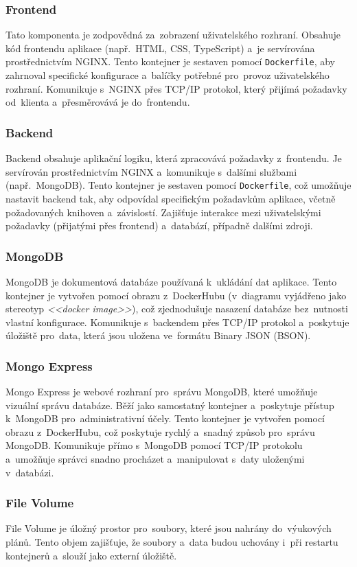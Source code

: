 \documentclass[male,czech,api_bc]{kitheses}
\begin{document}
\subsubsection{Frontend}
Tato komponenta je zodpovědná za~zobrazení uživatelského rozhraní. Obsahuje kód frontendu aplikace (např.~HTML, CSS, TypeScript) a~je servírována prostřednictvím NGINX. Tento kontejner je sestaven pomocí \texttt{Dockerfile}, aby zahrnoval specifické konfigurace a~balíčky potřebné pro~provoz uživatelského rozhraní. Komunikuje s~NGINX přes TCP/IP protokol, který přijímá požadavky od~klienta a~přesměrovává je do~frontendu.

\subsubsection{Backend}
Backend obsahuje aplikační logiku, která zpracovává požadavky z~frontendu. Je servírován prostřednictvím NGINX a~komunikuje s~dalšími službami (např.~MongoDB). Tento kontejner je sestaven pomocí \texttt{Dockerfile}, což umožňuje nastavit backend tak, aby odpovídal specifickým požadavkům aplikace, včetně požadovaných knihoven a~závislostí. Zajišťuje interakce mezi uživatelskými požadavky (přijatými přes frontend) a~databází, případně dalšími zdroji.

\subsubsection{MongoDB}
MongoDB je dokumentová databáze používaná k~ukládání dat aplikace. Tento kontejner je vytvořen pomocí obrazu z~DockerHubu (v~diagramu vyjádřeno jako stereotyp \textit{<<docker image>>}), což zjednodušuje nasazení databáze bez~nutnosti vlastní konfigurace. Komunikuje s~backendem přes TCP/IP protokol a~poskytuje úložiště pro~data, která jsou uložena ve~formátu Binary JSON (BSON).

\subsubsection{Mongo Express}
Mongo Express je webové rozhraní pro~správu MongoDB, které umožňuje vizuální správu databáze. Běží jako samostatný kontejner a~poskytuje přístup k~MongoDB pro~administrativní účely. Tento kontejner je vytvořen pomocí obrazu z~DockerHubu, což poskytuje rychlý a~snadný způsob pro~správu MongoDB. Komunikuje přímo s~MongoDB pomocí TCP/IP protokolu a~umožňuje správci snadno procházet a~manipulovat s~daty uloženými v~databázi.

\subsubsection{File Volume}
File Volume je úložný prostor pro~soubory, které jsou nahrány do~výukových plánů. Tento objem zajišťuje, že soubory a~data budou uchovány i~při restartu kontejnerů a~slouží jako externí úložiště.
\end{document}
